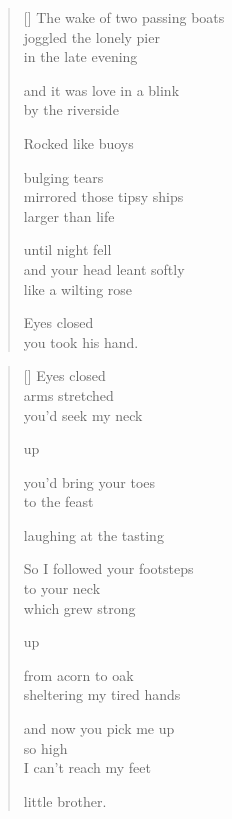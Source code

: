 \documentclass[14pt]{extbook}
\newcommand*{\centeredornament}{\centerline{\pgfornament[width=6cm]{88}}}
\begin{document}

\newpage

\vspace*{-15mm}
\centeredornament
\vspace*{-7mm}


\settowidth{\versewidth}{The wake of two passing boats}

\begin{verse}[\versewidth]
  The wake of two passing boats \\
  joggled the lonely pier \\
  in the late evening

  and it was love in a blink \\
  by the riverside

  Rocked like buoys

  bulging tears \\
  mirrored those tipsy ships \\
  larger than life

  until night fell \\
  and your head leant softly \\
  like a wilting rose

  Eyes closed \\
  you took his hand.
\end{verse}


\newpage

\vspace*{-15mm}
\centeredornament
\vspace*{-7mm}


\settowidth{\versewidth}{So I followed your footsteps}

\begin{verse}[\versewidth]
  Eyes closed \\
  arms stretched \\
  you'd seek my neck

  up

  you'd bring your toes \\
  to the feast

  laughing at the tasting

  So I followed your footsteps \\
  to your neck \\
  which grew strong

  up

  from acorn to oak \\
  sheltering my tired hands

  and now you pick me up \\
  so high \\
  I can't reach my feet

  little brother.
\end{verse}
\end{document}
